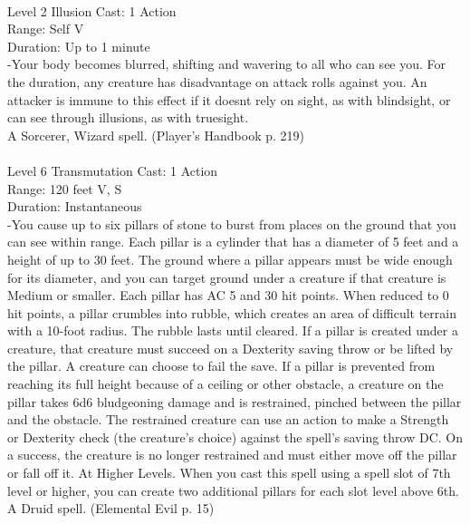 \documentclass[10pt,twocolumn]{report}
\begin{document}
 \\
Level 2 \quad Illusion \quad Cast: 1 Action\\
Range: Self \quad V\\
Duration: Up to 1 minute \quad \\
-Your body becomes blurred, shifting and wavering to all who can see you. For the duration, any creature has disadvantage on attack rolls against you. An attacker is immune to this effect if it doesnt rely on sight, as with blindsight, or can see through illusions, as with truesight.\\
A Sorcerer, Wizard spell. (Player's Handbook p. 219) \\


 \\
Level 6 \quad Transmutation \quad Cast: 1 Action\\
Range: 120 feet \quad V, S\\
Duration: Instantaneous \quad \\
-You cause up to six pillars of stone to burst from places on the ground that you can see within range. Each pillar is a cylinder that has a diameter of 5 feet and a height of up to 30 feet. The ground where a pillar appears must be wide enough for its diameter, and you can target ground under a creature if that creature is Medium or smaller. Each pillar has AC 5 and 30 hit points. When reduced to 0 hit points, a pillar crumbles into rubble, which creates an area of difficult terrain with a 10-foot radius. The rubble lasts until cleared.
If a pillar is created under a creature, that creature must succeed on a Dexterity saving throw or be lifted by the pillar. A creature can choose to fail the save.
If a pillar is prevented from reaching its full height because of a ceiling or other obstacle, a creature on the pillar takes 6d6 bludgeoning damage and is restrained, pinched between the pillar and the obstacle. The restrained creature can use an action to make a Strength or Dexterity check (the creature’s choice) against the spell’s saving throw DC. On a success, the creature is no longer restrained and must either move off the pillar or fall off it.
At Higher Levels. When you cast this spell using a spell slot of 7th level or higher, you can create two additional pillars for each slot level above 6th.\\
A Druid spell. (Elemental Evil p. 15) \\
\end{document}
